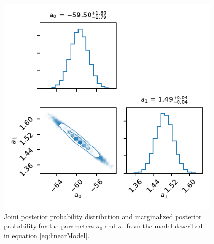 \begin{figure}
    \centering
    \includegraphics{CodeAndFigures/LinearModelMetropolisHastings.pdf}
    \caption{Joint posterior probability distribution and marginalized posterior probability for the parameters $a_0$ and $a_1$ from the model described in equation \ref{eq:linearModel}.}
    \label{fig:LinearHastings}
\end{figure}